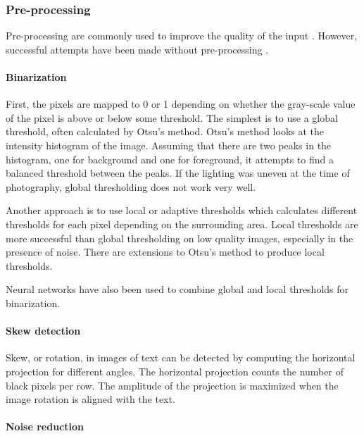 \subsubsection{Pre-processing}

Pre-processing are commonly used to improve the quality of the input \cite{HWR_survey}. However, successful attempts have been made without pre-processing \cite{FornesCnnCategorization}.

\paragraph{Binarization}

First, the pixels are mapped to 0 or 1 depending on whether the gray-scale value of the pixel is above or below some threshold. The simplest is to use a global threshold, often calculated by Otsu's method. Otsu's method looks at the intensity histogram of the image. Assuming that there are two peaks in the histogram, one for background and one for foreground, it attempts to find a balanced threshold between the peaks. If the lighting was uneven at the time of photography, global thresholding does not work very well.

Another approach is to use local or adaptive thresholds which calculates different thresholds for each pixel depending on the surrounding area. Local thresholds are more successful than global thresholding on low quality images, especially in the presence of noise. There are extensions to Otsu's method to produce local thresholds.

Neural networks have also been used to combine global and local thresholds for binarization.

\paragraph{Skew detection}

Skew, or rotation, in images of text can be detected by computing the horizontal projection for different angles. The horizontal projection counts the number of black pixels per row. The amplitude of the projection is maximized when the image rotation is aligned with the text.

\paragraph{Noise reduction}


